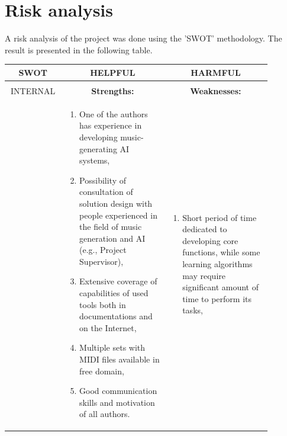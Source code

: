 \documentclass{article}
\begin{document}
\newpage
\section{Risk analysis}
A risk analysis of the project was done using the 'SWOT' methodology. The result is presented in the following table.

\begin{center}
    \begin{tabular}{ |p{0.15\linewidth}|p{0.365\linewidth}|p{0.365\linewidth}| }
        \hline
        \multicolumn{1}{|c|}{\textbf{SWOT}}                                                                                                              & \multicolumn{1}{|c|}{HELPFUL}                 & \multicolumn{1}{|c|}{HARMFUL}              \\
        \hline
                                                                                                                                                         &                                               &                                            \\
        \multicolumn{1}{|c|}{INTERNAL}                                                                                                                   & \multicolumn{1}{|c|}{\textbf{Strengths:}}     & \multicolumn{1}{|c|}{\textbf{Weaknesses:}} \\
                                                                                                                                                         &
        \begin{enumerate}
            \item One of the authors has experience in developing music-generating AI systems,
            \item Possibility of consultation of solution design with people experienced in the field of music generation and AI (e.g., Project Supervisor),
            \item Extensive coverage of capabilities of used tools both in documentations and on the Internet,
            \item Multiple sets with MIDI files available in free domain,
            \item Good communication skills and motivation of all authors.
        \end{enumerate} &
        \begin{enumerate}
            \item Short period of time dedicated to developing core functions, while some learning algorithms may require significant amount of time to perform its tasks,

\end{enumerate}
\end{tabular}
\end{center}
\end{document}
